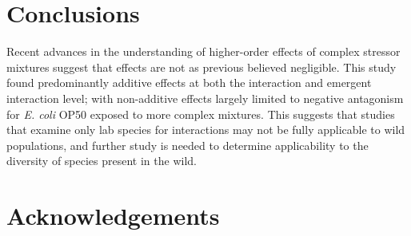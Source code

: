 \documentclass[final,1p,times]{elsarticle}
\begin{document}
\section{Conclusions}
\label{S:5}

Recent advances in the understanding of higher-order effects of complex stressor mixtures suggest that effects are not as previous believed negligible. This study found predominantly additive effects at both the interaction and emergent interaction level; with non-additive effects largely limited to negative antagonism for \textit{E. coli} OP50 exposed to more complex mixtures. This suggests that studies that examine only lab species for interactions may not be fully applicable to wild populations, and further study is needed to determine applicability to the diversity of species present in the wild.

\section{Acknowledgements}
\label{S:6}


\end{document}
